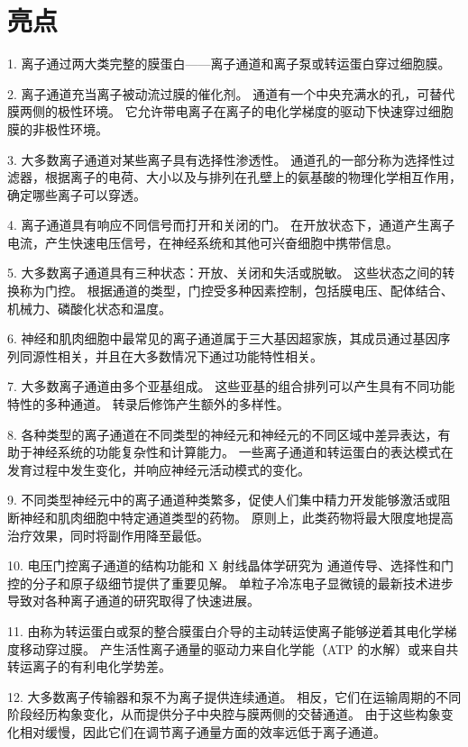 \section{亮点}


1. 离子通过两大类完整的膜蛋白——离子通道和离子泵或转运蛋白穿过细胞膜。


2. 离子通道充当离子被动流过膜的催化剂。
通道有一个中央充满水的孔，可替代膜两侧的极性环境。 
它允许带电离子在离子的电化学梯度的驱动下快速穿过细胞膜的非极性环境。


3. 大多数离子通道对某些离子具有选择性渗透性。
通道孔的一部分称为选择性过滤器，根据离子的电荷、大小以及与排列在孔壁上的氨基酸的物理化学相互作用，确定哪些离子可以穿透。


4. 离子通道具有响应不同信号而打开和关闭的门。
在开放状态下，通道产生离子电流，产生快速电压信号，在神经系统和其他可兴奋细胞中携带信息。


5. 大多数离子通道具有三种状态：开放、关闭和失活或脱敏。
这些状态之间的转换称为门控。
根据通道的类型，门控受多种因素控制，包括膜电压、配体结合、机械力、磷酸化状态和温度。


6. 神经和肌肉细胞中最常见的离子通道属于三大基因超家族，其成员通过基因序列同源性相关，并且在大多数情况下通过功能特性相关。


7. 大多数离子通道由多个亚基组成。
这些亚基的组合排列可以产生具有不同功能特性的多种通道。 转录后修饰产生额外的多样性。


8. 各种类型的离子通道在不同类型的神经元和神经元的不同区域中差异表达，有助于神经系统的功能复杂性和计算能力。
一些离子通道和转运蛋白的表达模式在发育过程中发生变化，并响应神经元活动模式的变化。


9. 不同类型神经元中的离子通道种类繁多，促使人们集中精力开发能够激活或阻断神经和肌肉细胞中特定通道类型的药物。
原则上，此类药物将最大限度地提高治疗效果，同时将副作用降至最低。


10. 电压门控离子通道的结构功能和 X 射线晶体学研究为  通道传导、选择性和门控的分子和原子级细节提供了重要见解。
单粒子冷冻电子显微镜的最新技术进步导致对各种离子通道的研究取得了快速进展。


11. 由称为转运蛋白或泵的整合膜蛋白介导的主动转运使离子能够逆着其电化学梯度移动穿过膜。
产生活性离子通量的驱动力来自化学能（ATP 的水解）或来自共转运离子的有利电化学势差。


12. 大多数离子传输器和泵不为离子提供连续通道。
相反，它们在运输周期的不同阶段经历构象变化，从而提供分子中央腔与膜两侧的交替通道。
由于这些构象变化相对缓慢，因此它们在调节离子通量方面的效率远低于离子通道。



